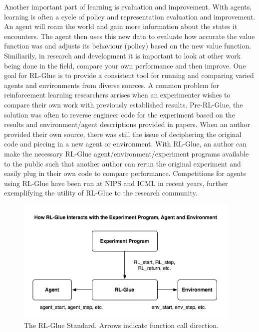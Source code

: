 \documentclass[11pt]{article}
\begin{document}
Another important part of learning is evaluation and improvement. With agents, learning is often a cycle of policy and representation evaluation and improvement.  An agent will roam the world and gain more information about the states it encounters. The agent then uses this new data to evaluate how accurate the value function was and adjusts its behaviour (policy) based on the new value function. Similiarily, in research and development it is important to look at other work being done in the field, compare your own performance and then improve. One goal for RL-Glue is to provide a consistent tool for running and comparing varied agents and environments from diverse sources. A common problem for reinforcement learning researchers arrises when an experimenter wishes to compare their own work with previously established results. Pre-RL-Glue, the solution was often to reverse engineer code for the experiment based on the results and environment/agent descriptions provided in papers.  When an author provided their own source, there was still the issue of deciphering the original code and piecing in a new agent or environment. With RL-Glue, an author can make the necessary RL-Glue agent/environment/experiment programs  available to the public such that another author can rerun the original experiment and easily plug in their own code to compare performance.  Competitions for agents using RL-Glue have been run at NIPS and ICML in recent years, further exemplifying the utility of RL-Glue to the research community.
 
\begin{figure}
\label{fig1}
\begin{center}
\includegraphics[height=60mm]{images/glue_connections_no_shadow.png}
\caption{The RL-Glue Standard. Arrows indicate function call direction.}
\end{center}
\end{figure}
\end{document}

